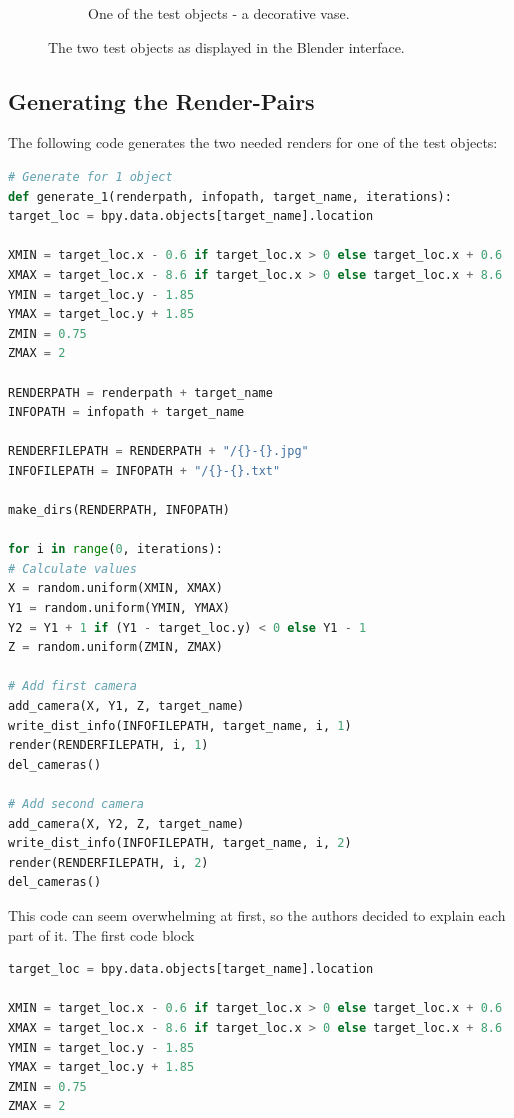 \begin{figure}[h!]
\begin{subfigure}[t]{0.4\textwidth}
		\caption{One of the test objects - a decorative vase.}
	\end{subfigure}
	\caption{The two test objects as displayed in the Blender interface.}
	\label{pic:implementation_generatingData_testObject}
\end{figure}

\newpage

\subsection{Generating the Render-Pairs}
The following code generates the two needed renders for one of the test objects:

\begin{lstlisting}[language=python]
# Generate for 1 object
def generate_1(renderpath, infopath, target_name, iterations):
target_loc = bpy.data.objects[target_name].location

XMIN = target_loc.x - 0.6 if target_loc.x > 0 else target_loc.x + 0.6
XMAX = target_loc.x - 8.6 if target_loc.x > 0 else target_loc.x + 8.6
YMIN = target_loc.y - 1.85
YMAX = target_loc.y + 1.85
ZMIN = 0.75
ZMAX = 2

RENDERPATH = renderpath + target_name
INFOPATH = infopath + target_name

RENDERFILEPATH = RENDERPATH + "/{}-{}.jpg"
INFOFILEPATH = INFOPATH + "/{}-{}.txt"

make_dirs(RENDERPATH, INFOPATH)

for i in range(0, iterations):
# Calculate values
X = random.uniform(XMIN, XMAX)
Y1 = random.uniform(YMIN, YMAX)
Y2 = Y1 + 1 if (Y1 - target_loc.y) < 0 else Y1 - 1
Z = random.uniform(ZMIN, ZMAX)

# Add first camera
add_camera(X, Y1, Z, target_name)
write_dist_info(INFOFILEPATH, target_name, i, 1)
render(RENDERFILEPATH, i, 1)
del_cameras()

# Add second camera
add_camera(X, Y2, Z, target_name)
write_dist_info(INFOFILEPATH, target_name, i, 2)
render(RENDERFILEPATH, i, 2)
del_cameras()
\end{lstlisting}

This code can seem overwhelming at first, so the authors decided to explain each part of it. The first code block

\begin{lstlisting}[language=python]
target_loc = bpy.data.objects[target_name].location

XMIN = target_loc.x - 0.6 if target_loc.x > 0 else target_loc.x + 0.6
XMAX = target_loc.x - 8.6 if target_loc.x > 0 else target_loc.x + 8.6
YMIN = target_loc.y - 1.85
YMAX = target_loc.y + 1.85
ZMIN = 0.75
ZMAX = 2
\end{lstlisting}

